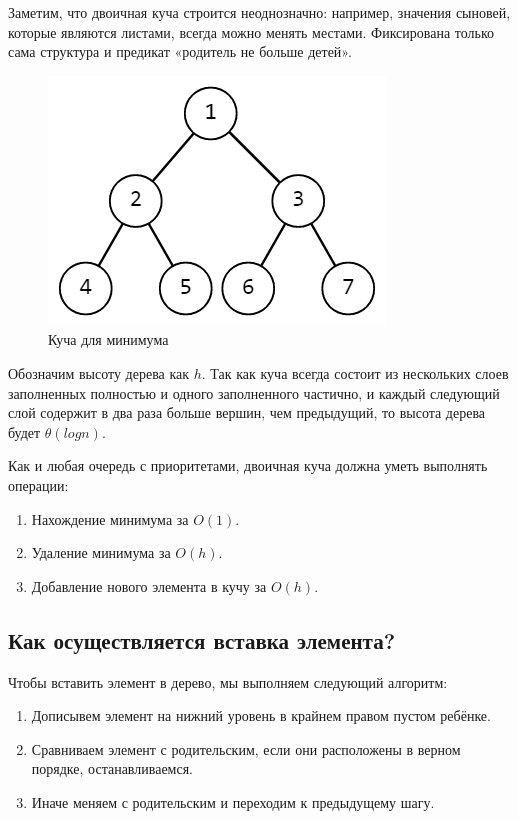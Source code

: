 \documentclass{article}
\begin{document}
Заметим, что двоичная куча строится неоднозначно: например, значения сыновей, которые являются листами, всегда можно менять местами. Фиксирована только сама структура и предикат «родитель не больше детей».

\begin{figure}[h]
    \centering
    \includegraphics[width=0.4\linewidth]{1.png}

    \caption{Куча для минимума}

    \label{fig:mpr}

\end{figure}

Обозначим высоту дерева как $h$. Так как куча всегда состоит из нескольких слоев заполненных полностью и одного заполненного частично, и каждый следующий слой содержит в два раза больше вершин, чем предыдущий, то высота дерева будет $\theta(log n)$.

Как и любая очередь с приоритетами, двоичная куча должна уметь выполнять операции:

\begin{enumerate}
    \item Нахождение минимума за $O(1)$.
    \item Удаление минимума за $O(h)$.
    \item Добавление нового элемента в кучу за $O(h)$.
\end{enumerate}

\subsection{Как осуществляется вставка элемента?}

Чтобы вставить элемент в дерево, мы выполняем следующий алгоритм:

\begin{enumerate}
    \item Дописывем элемент на нижний уровень в крайнем правом пустом ребёнке.
    \item Сравниваем элемент с родительским, если они расположены в верном порядке, останавливаемся.
    \item Иначе меняем с родительским и переходим к предыдущему шагу.
\end{enumerate}
\end{document}
